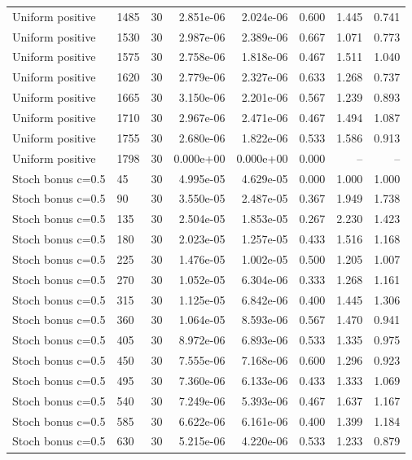 \begin{scriptsize}
\begin{longtable}{llrrrrrr}
Uniform positive & 1485 & 30 & 2.851e-06 & 2.024e-06 & 0.600 & 1.445 & 0.741 \\
Uniform positive & 1530 & 30 & 2.987e-06 & 2.389e-06 & 0.667 & 1.071 & 0.773 \\
Uniform positive & 1575 & 30 & 2.758e-06 & 1.818e-06 & 0.467 & 1.511 & 1.040 \\
Uniform positive & 1620 & 30 & 2.779e-06 & 2.327e-06 & 0.633 & 1.268 & 0.737 \\
Uniform positive & 1665 & 30 & 3.150e-06 & 2.201e-06 & 0.567 & 1.239 & 0.893 \\
Uniform positive & 1710 & 30 & 2.967e-06 & 2.471e-06 & 0.467 & 1.494 & 1.087 \\
Uniform positive & 1755 & 30 & 2.680e-06 & 1.822e-06 & 0.533 & 1.586 & 0.913 \\
Uniform positive & 1798 & 30 & 0.000e+00 & 0.000e+00 & 0.000 & -- & -- \\
Stoch bonus c=0.5 & 45 & 30 & 4.995e-05 & 4.629e-05 & 0.000 & 1.000 & 1.000 \\
Stoch bonus c=0.5 & 90 & 30 & 3.550e-05 & 2.487e-05 & 0.367 & 1.949 & 1.738 \\
Stoch bonus c=0.5 & 135 & 30 & 2.504e-05 & 1.853e-05 & 0.267 & 2.230 & 1.423 \\
Stoch bonus c=0.5 & 180 & 30 & 2.023e-05 & 1.257e-05 & 0.433 & 1.516 & 1.168 \\
Stoch bonus c=0.5 & 225 & 30 & 1.476e-05 & 1.002e-05 & 0.500 & 1.205 & 1.007 \\
Stoch bonus c=0.5 & 270 & 30 & 1.052e-05 & 6.304e-06 & 0.333 & 1.268 & 1.161 \\
Stoch bonus c=0.5 & 315 & 30 & 1.125e-05 & 6.842e-06 & 0.400 & 1.445 & 1.306 \\
Stoch bonus c=0.5 & 360 & 30 & 1.064e-05 & 8.593e-06 & 0.567 & 1.470 & 0.941 \\
Stoch bonus c=0.5 & 405 & 30 & 8.972e-06 & 6.893e-06 & 0.533 & 1.335 & 0.975 \\
Stoch bonus c=0.5 & 450 & 30 & 7.555e-06 & 7.168e-06 & 0.600 & 1.296 & 0.923 \\
Stoch bonus c=0.5 & 495 & 30 & 7.360e-06 & 6.133e-06 & 0.433 & 1.333 & 1.069 \\
Stoch bonus c=0.5 & 540 & 30 & 7.249e-06 & 5.393e-06 & 0.467 & 1.637 & 1.167 \\
Stoch bonus c=0.5 & 585 & 30 & 6.622e-06 & 6.161e-06 & 0.400 & 1.399 & 1.184 \\
Stoch bonus c=0.5 & 630 & 30 & 5.215e-06 & 4.220e-06 & 0.533 & 1.233 & 0.879 \\

\end{longtable}
\end{scriptsize}
